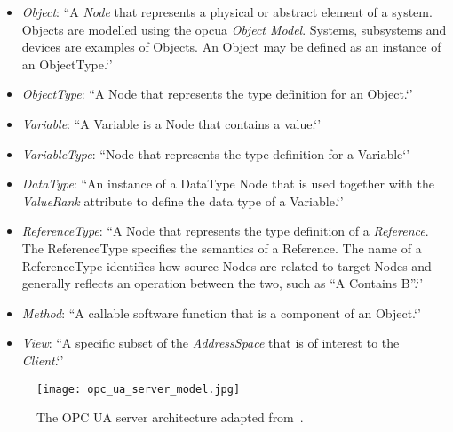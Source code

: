 \documentclass[
a4paper,
twoside,
headsepline,
cleardoublepage=empty,
parskip=half,
draft=false
]{scrbook}
\begin{document}
				\begin{itemize}

					\item \textit{Object}: ``A \textit{Node} that represents a physical or abstract element of a system. Objects are modelled using the \gls{opcua} \textit{Object Model}. Systems, subsystems and devices are examples of Objects. An Object may be defined as an instance of an ObjectType.`'~\cite{opcfoundation2017part1}

					\item \textit{ObjectType}: ``A Node that represents the type definition
					for an Object.`'~\cite{opcfoundation2017part1}

					\item \textit{Variable}: ``A Variable is a Node that contains a value.`'~\cite{opcfoundation2017part1}

					\item \textit{VariableType}: ``Node that represents the type definition for a Variable`'~\cite{opcfoundation2018part3}

					\item \textit{DataType}: ``An instance of a DataType Node that is used together with the \textit{ValueRank} attribute to define the data type of a Variable.`'~\cite{opcfoundation2018part3}

					\item \textit{ReferenceType}: ``A Node that represents the type definition of a \textit{Reference}. The ReferenceType specifies the semantics of a Reference. The name of a ReferenceType identifies how source Nodes are related to target Nodes and generally reflects an operation between the two, such as “A Contains B”.`'~\cite{opcfoundation2017part1}

					\item \textit{Method}: ``A callable software function that is a component of an Object.`'~\cite{opcfoundation2017part1}

					\item \textit{View}: ``A specific subset of the \textit{AddressSpace} that is of interest to the \textit{Client}.`'~\cite{opcfoundation2017part1}

				\end{itemize}

				\begin{figure}[htbp]
					\centering
					\texttt{[image: opc\_ua\_server\_model.jpg]}
					\caption{The OPC UA server architecture adapted from~\cite{opcfoundation2017part1}.}
					\label{fig:opc_ua_server_model}
				\end{figure}
\end{document}
